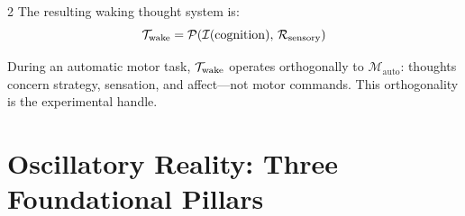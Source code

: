 \begin{multicols}{2}
The resulting waking thought system is:
\begin{equation}
\mathcal{T}_{\mathrm{wake}} = \mathcal{P}\!\left(\mathcal{I}(\mathrm{cognition}),\, \mathcal{R}_{\mathrm{sensory}}\right)
\end{equation}

During an automatic motor task, $\mathcal{T}_{\mathrm{wake}}$ operates orthogonally to $\mathcal{M}_{\mathrm{auto}}$: thoughts concern strategy, sensation, and affect---not motor commands. This orthogonality is the experimental handle.

\end{multicols}

\section{Oscillatory Reality: Three Foundational Pillars}

